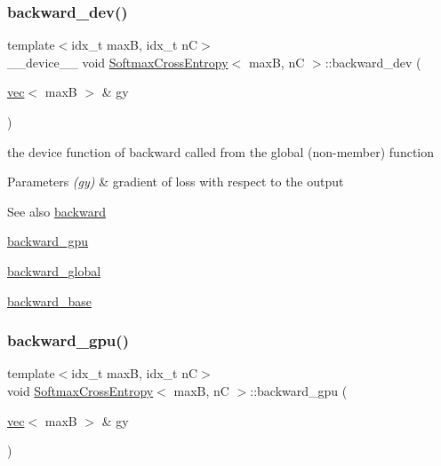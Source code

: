 \subsubsection{\texorpdfstring{backward\+\_\+dev()}{backward\_dev()}}
{\footnotesize\ttfamily template$<$idx\+\_\+t maxB, idx\+\_\+t nC$>$ \\
\+\_\+\+\_\+device\+\_\+\+\_\+ void \hyperlink{structSoftmaxCrossEntropy}{Softmax\+Cross\+Entropy}$<$ maxB, nC $>$\+::backward\+\_\+dev (\begin{DoxyParamCaption}\item[{\hyperlink{structvec}{vec}$<$ maxB $>$ \&}]{gy }\end{DoxyParamCaption})\hspace{0.3cm}{\ttfamily [inline]}}



the device function of backward called from the global (non-\/member) function 


\begin{DoxyParams}{Parameters}
{\em (gy)} & gradient of loss with respect to the output \\
\hline
\end{DoxyParams}
\begin{DoxySeeAlso}{See also}
\hyperlink{structSoftmaxCrossEntropy_afb506c6159bd6cd02a6c5e8426628fe0}{backward} 

\hyperlink{structSoftmaxCrossEntropy_a767b5a911be901ce811ffca5fb88af74}{backward\+\_\+gpu} 

\hyperlink{softmaxcrossentropy_8h_a47d56a9a23e08247b227f4aac17413e0}{backward\+\_\+global} 

\hyperlink{structSoftmaxCrossEntropy_a1cea37bcbeedb5749f56f740baa6ce92}{backward\+\_\+base} 
\end{DoxySeeAlso}
\mbox{\label{structSoftmaxCrossEntropy_a767b5a911be901ce811ffca5fb88af74}} 
\subsubsection{\texorpdfstring{backward\+\_\+gpu()}{backward\_gpu()}}
{\footnotesize\ttfamily template$<$idx\+\_\+t maxB, idx\+\_\+t nC$>$ \\
void \hyperlink{structSoftmaxCrossEntropy}{Softmax\+Cross\+Entropy}$<$ maxB, nC $>$\+::backward\+\_\+gpu (\begin{DoxyParamCaption}\item[{\hyperlink{structvec}{vec}$<$ maxB $>$ \&}]{gy }\end{DoxyParamCaption})\hspace{0.3cm}{\ttfamily [inline]}}



